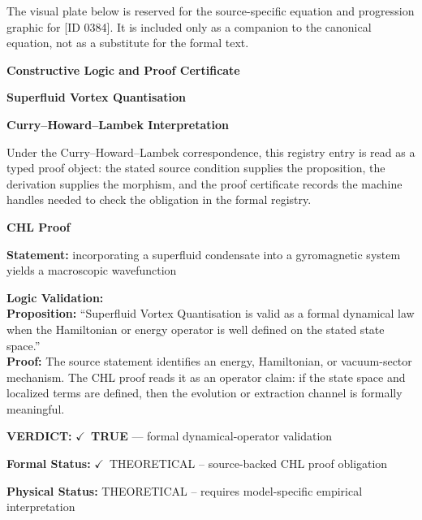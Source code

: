\begingroup\footnotesize\sloppy
The visual plate below is reserved for the source-specific equation and progression graphic for [ID 0384]. It is included only as a companion to the canonical equation, not as a substitute for the formal text.
\par\endgroup
\ifTZPDarkEdition
{}
\fi

\clearpage
\begingroup\tzpsupportsetup
\noindent\textbf{\fontsize{10.8pt}{12.8pt}\selectfont [ID 0384] Constructive Logic and Proof Certificate}\par
\noindent\textbf{\fontsize{10pt}{12pt}\selectfont Superfluid Vortex Quantisation}\par
\vspace{0.45em}
\begingroup
\footnotesize
\setlength{\parskip}{0.22em}
\setlength{\parindent}{0pt}
\noindent\textbf{Curry--Howard--Lambek Interpretation}\par
Under the Curry--Howard--Lambek correspondence, this registry entry is read as a typed proof
object: the stated source condition supplies the proposition, the derivation supplies the
morphism, and the proof certificate records the machine handles needed to check the obligation
in the formal registry.

\vspace{0.45em}
\noindent\textbf{CHL Proof}\par
\textbf{Statement:} incorporating a superfluid condensate into a gyromagnetic system yields a macroscopic
wavefunction

\textbf{Logic Validation:}\\
\textbf{Proposition:} ``Superfluid Vortex Quantisation is valid as a formal dynamical law when the Hamiltonian
or energy operator is well defined on the stated state space.''\\
\textbf{Proof:} The source statement identifies an energy, Hamiltonian, or vacuum-sector mechanism. The
CHL proof reads it as an operator claim: if the state space and localized terms are
defined, then the evolution or extraction channel is formally meaningful.

\textbf{VERDICT:} \ensuremath{\checkmark}\ \textbf{TRUE} --- formal dynamical-operator validation

\textbf{Formal Status:} \ensuremath{\checkmark}\ THEORETICAL -- source-backed CHL proof obligation

\textbf{Physical Status:} THEORETICAL -- requires model-specific empirical interpretation
\par\vspace{0.45em}
\par
\ifTZPDarkEdition
{}
\fi
\endgroup
\endgroup
